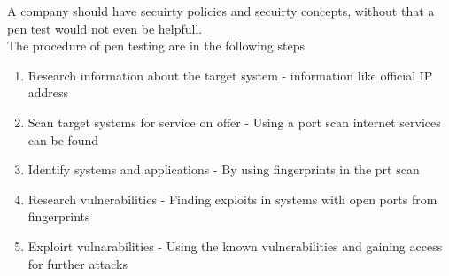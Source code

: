 \documentclass[12pt, a4paper]{article}
\begin{document}
		A company should have secuirty policies and secuirty concepts, without that a pen test would not even be helpfull.\\
		The procedure of pen testing are in the following steps
		\begin{enumerate}
			\item Research information about the target system - information like official IP address
			\item Scan target systems for service on offer - Using a port scan internet services can be found
			\item Identify systems and applications - By using fingerprints in the prt scan
			\item Research vulnerabilities - Finding exploits in systems with open ports from fingerprints
			\item Exploirt vulnarabilities - Using the known vulnerabilities and gaining access for further attacks
		\end{enumerate}
\end{document}
